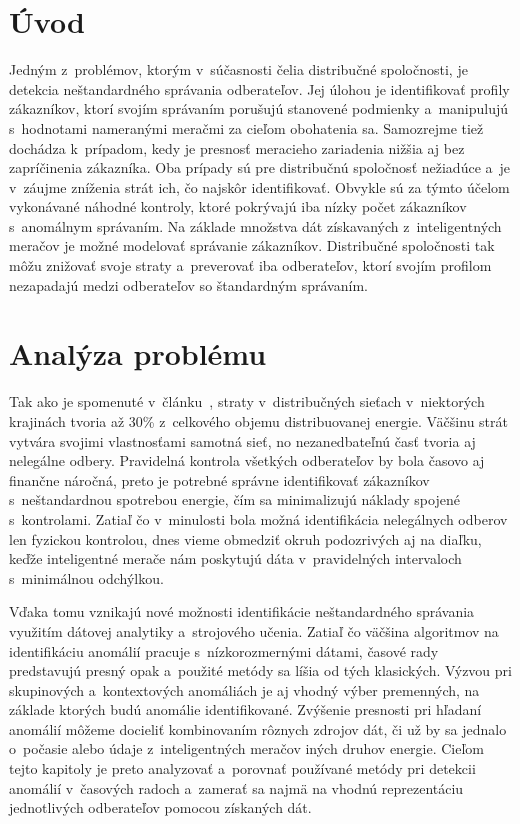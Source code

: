 \documentclass[a4paper,twoside,slovak,12pt,appendix]{article}
\begin{document}
\newpage
\setcounter{page}{1}
\section{Úvod}
Jedným z~problémov, ktorým v~súčasnosti čelia distribučné spoločnosti, je
detekcia neštandardného správania odberateľov. Jej úlohou je identifikovať
profily zákazníkov, ktorí svojím správaním porušujú stanovené podmienky
a~manipulujú s~hodnotami nameranými meračmi za cieľom obohatenia sa. Samozrejme
tiež dochádza k~prípadom, kedy je presnosť meracieho zariadenia nižšia aj bez
zapríčinenia zákazníka. Oba prípady sú pre distribučnú spoločnosť nežiadúce a~je
v~záujme zníženia strát ich, čo najskôr identifikovať. Obvykle sú za týmto
účelom vykonávané náhodné kontroly, ktoré pokrývajú iba nízky počet zákazníkov
s~anomálnym správaním. Na základe množstva dát získavaných z~inteligentných
meračov je možné modelovať správanie zákazníkov. Distribučné spoločnosti tak
môžu znižovať svoje straty a~preverovať iba odberateľov, ktorí svojím profilom
nezapadajú medzi odberateľov so štandardným správaním.



\newpage
\section{Analýza problému}
\label{c:problem-analysis}
Tak ako je spomenuté v~článku~\cite{Meffe2009}, straty v~distribučných sieťach
v~niektorých krajinách tvoria až 30\% z~celkového objemu distribuovanej energie.
Väčšinu strát vytvára svojimi vlastnosťami samotná sieť, no nezanedbateľnú časť
tvoria aj nelegálne odbery. Pravidelná kontrola všetkých odberateľov by bola
časovo aj finančne náročná, preto je potrebné správne identifikovať zákazníkov
s~neštandardnou spotrebou energie, čím sa minimalizujú náklady spojené
s~kontrolami. Zatiaľ čo v~minulosti bola možná identifikácia nelegálnych odberov
len fyzickou kontrolou, dnes vieme obmedziť okruh podozrivých aj na diaľku,
keďže inteligentné merače nám poskytujú dáta v~pravidelných intervaloch
s~minimálnou odchýlkou.

Vďaka tomu vznikajú nové možnosti identifikácie neštandardného správania
využitím dátovej analytiky a~strojového učenia. Zatiaľ čo väčšina algoritmov na
identifikáciu anomálií pracuje s~nízkorozmernými dátami, časové rady predstavujú
presný opak a~použité metódy sa líšia od tých klasických. Výzvou pri skupinových
a~kontextových anomáliách je aj vhodný výber premenných, na základe ktorých budú
anomálie identifikované. Zvýšenie presnosti pri hľadaní anomálií môžeme docieliť
kombinovaním rôznych zdrojov dát, či už by sa jednalo o~počasie alebo údaje
z~inteligentných meračov iných druhov energie. Cieľom tejto kapitoly je preto
analyzovať a~porovnať používané metódy pri detekcii anomálií v~časových radoch
a~zamerať sa najmä na vhodnú reprezentáciu jednotlivých odberateľov pomocou
získaných dát.
\end{document}
